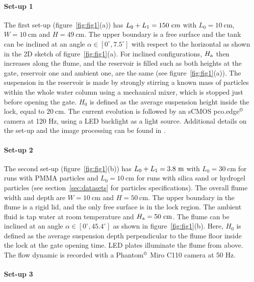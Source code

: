 \documentclass[12pt]{article}
\begin{document}
\paragraph{Set-up 1}

The first set-up (figure~\ref{fig:fig1}(a)) has $L_0+L_1=150~{\text cm}$ with $L_0 = 10~\textrm{cm}$, $W = 10~\textrm{cm}$ and $H=49~\textrm{cm}$. The upper boundary is a free surface and the tank can be inclined at an angle $\alpha\in[0^\circ,7.5^\circ]$ with respect to the horizontal as shown in the 2D sketch of figure~\ref{fig:fig1}(a). For inclined configurations, $H_{\text a}$ then increases along the flume, and the reservoir is filled such as both heights at the gate, reservoir one and ambient one, are the same (see figure~\ref{fig:fig1}(a)). The suspension in the reservoir is made by strongly stirring a known mass of particles within the whole water column using a mechanical mixer, which is stopped just before opening the gate. $H_{0}$ is defined as the average suspension height inside the lock, equal to $20~\textrm{cm}$.
%
The current evolution is followed by an sCMOS pco.edge$^\copyright$ camera at 120 Hz, using a LED backlight as a light source. Additional details on the set-up and the image processing can be found in \citet{Gadal2023}.

\paragraph{Set-up 2}
The second set-up (figure~\ref{fig:fig1}(b)) has $L_0+L_1=3.8~{\text m}$ with $L_0 = 30~\textrm{cm}$ for runs with PMMA particles and $L_0 = 10~\textrm{cm}$ for runs with silica sand or hydrogel particles (see section~\ref{sec:datasets} for particles specifications). The overall flume width and depth are $W= 10~\textrm{cm}$ and $H= 50~\textrm{cm}$. The upper boundary in the flume is a rigid lid, and the only free surface is in the lock region. The ambient fluid is tap water at room temperature and $H_{\text a}=50~\textrm{cm}$. The flume can be inclined at an angle $\alpha \in [0^\circ,45.4^\circ]$ as shown in figure~\ref{fig:fig1}(b). Here, $H_0$ is defined as the average suspension depth perpendicular to the flume floor inside the lock at the gate opening time. LED plates illuminate the flume from above. The flow dynamic is recorded with a Phantom$^\copyright$ Miro C110 camera at 50 Hz.

\paragraph{Set-up 3}
\end{document}
